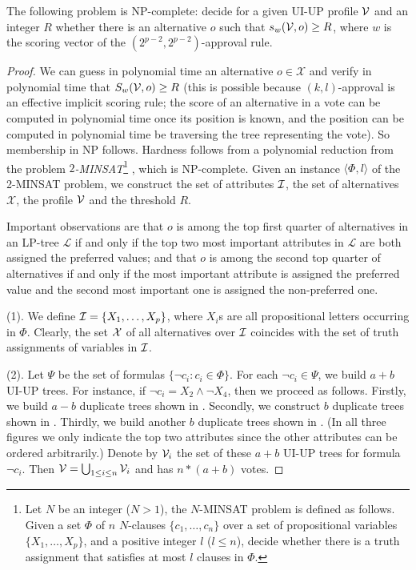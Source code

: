 \begin{thm}
The following problem is NP-complete: decide for a given UI-UP profile 
$\mathcal{V}$ and an integer $R$ whether there is an alternative $o$ such that 
$s_w(\mathcal{V},o) \geq R$, where $w$ is the scoring vector of the $(2^{p-2},
2^{p-2})$-approval rule.
\end{thm}
\begin{proof}
        We can guess in polynomial time an alternative $o \in \mathcal{X}$ and
        verify in polynomial time that $S_w(\mathcal{V}, o) \geq R$ (this is possible 
because $(k,l)$-approval is an effective implicit scoring rule; the score of an alternative in
a vote can be computed in polynomial time once its position is known, and 
the position can be computed in polynomial time be traversing the tree 
representing the vote).  So membership in NP follows.
        Hardness follows from a polynomial reduction from the
        problem $2$\textit{-MINSAT}\footnote{Let $N$ be an integer ($N>1$),
				the $N$-MINSAT problem
        is defined as follows.  Given a set $\Phi$ of $n$ $N$-clauses
        $\{ c_1,\ldots,c_n \}$ over a set of propositional variables
        $\{ X_1,\ldots,X_p \}$,
        and a positive
        integer $l$ ($l \leq n$), decide whether there is a truth assignment that
        satisfies at most $l$ clauses in $\Phi$.} \cite{Kohli:2maxsat}, which is NP-complete.
        Given an instance $\langle \Phi, l \rangle$ of the 2-MINSAT problem,
we construct the set of attributes
        $\mathcal{I}$, the set of alternatives $\mathcal{X}$, the profile $\mathcal{V}$ and the threshold $R$.

        Important observations are that $o$ is among the
				top first quarter of alternatives in an LP-tree 
$\mathcal{L}$ if and only if the top two most important attributes in $\mathcal{L}$ 
are both assigned the preferred values; and that $o$ is among the second top 
quarter of alternatives if and only if the most important attribute is assigned 
the preferred value and the second most important one is assigned the 
non-preferred one.
				
\noindent
(1). We define $\mathcal{I} = \{ X_1,\ldots,X_p \}$, where $X_i$s are all propositional
letters occurring in $\Phi$. Clearly, the set $\mathcal{X}$ of all alternatives over 
$\mathcal{I}$ coincides with the set of truth assignments of variables in $\mathcal{I}$.

\noindent
(2). Let $\Psi$ be the set of formulas $\{ \neg c_i:c_i \in \Phi \}$.  
For each $\neg c_i \in \Psi$, we build $a+b$ UI-UP trees. For instance, 
if $\neg c_i = X_2 \land \neg X_4$, then we proceed as follows.
Firstly, we build $a-b$ duplicate trees shown in
. Secondly, we construct $b$ duplicate trees shown in
. Thirdly, we build another $b$ duplicate trees shown in
. (In all three figures we only indicate the top two attributes 
since the other attributes can be ordered arbitrarily.) Denote by $\mathcal{V}_i$ the 
set of these $a+b$ UI-UP trees for formula $\neg c_i$. Then $\mathcal{V} = \bigcup_{1 
\leq i \leq n} \mathcal{V}_i$ and has $n*(a+b)$ votes.


\end{proof}
